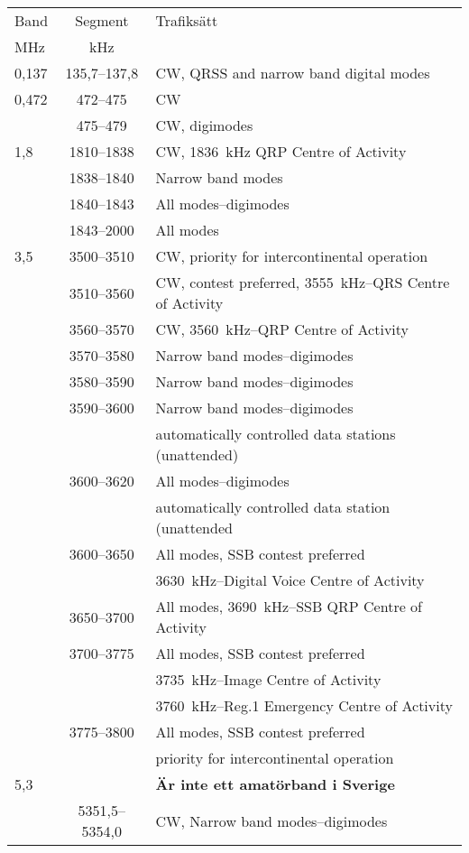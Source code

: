 \begin{xtabular}{lcl}
Band & Segment & Trafiksätt \\
MHz  & kHz     & \\ \hline
0,137 & 135,7--137,8 & CW, QRSS and narrow band digital modes\\
0,472 & 472--475 & CW\\
 & 475--479 & CW, digimodes\\
%
1,8  & 1810--1838 & CW, 1836~kHz QRP Centre of Activity\\
     & 1838--1840 & Narrow band modes\\
     & 1840--1843 & All modes--digimodes\\
     & 1843--2000 & All modes\\
%
3,5  & 3500--3510 & CW, priority for intercontinental operation\\
     & 3510--3560 & CW, contest preferred, 3555~kHz--QRS Centre of Activity\\
     & 3560--3570 & CW, 3560~kHz--QRP Centre of Activity\\
     & 3570--3580 & Narrow band modes--digimodes\\
     & 3580--3590 & Narrow band modes--digimodes\\
     & 3590--3600 & Narrow band modes--digimodes\\
     & & automatically controlled data stations (unattended)\\
     & 3600--3620 & All modes--digimodes\\
     & & automatically controlled data station (unattended\\
     & 3600--3650 & All modes, SSB contest preferred\\
     & & 3630~kHz--Digital Voice Centre of Activity\\
     & 3650--3700 & All modes, 3690~kHz--SSB QRP Centre of Activity\\
     & 3700--3775 & All modes, SSB contest preferred\\
     & & 3735~kHz--Image Centre of Activity\\
     & & 3760~kHz--Reg.1 Emergency Centre of Activity\\
     & 3775--3800 & All modes, SSB contest preferred\\
     & & priority for intercontinental operation\\
%
5,3  & & \textbf{Är inte ett amatörband i Sverige}\\
 & 5351,5--5354,0 & CW, Narrow band modes--digimodes\\

\end{xtabular}
